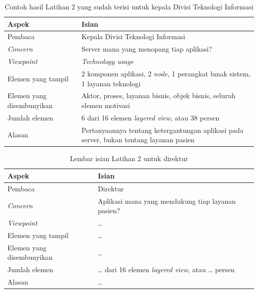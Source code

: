 \begin{table}[!htb]
  \centering
  \caption{Contoh hasil Latihan 2 yang sudah terisi untuk kepala Divisi
           Teknologi Informasi}
  \label{tab:ch04-lat2-contoh}
  \small
  \begin{tabularx}{\textwidth}{>{\raggedright\arraybackslash}p{3.2cm}X}
    \hline
    \textbf{Aspek} & \textbf{Isian} \\
    \hline
    Pembaca & Kepala Divisi Teknologi Informasi \\
    \hline
    \textit{Concern} & Server mana yang menopang tiap aplikasi? \\
    \hline
    \textit{Viewpoint} & \textit{Technology usage} \\
    \hline
    Elemen yang tampil & 2 komponen aplikasi, 2 \textit{node}, 1 perangkat lunak sistem, 1 layanan teknologi \\
    \hline
    Elemen yang disembunyikan & Aktor, proses, layanan bisnis, objek bisnis, seluruh elemen motivasi \\
    \hline
    Jumlah elemen & 6 dari 16 elemen \textit{layered view}, atau 38 persen \\
    \hline
    Alasan & Pertanyaannya tentang ketergantungan aplikasi pada server, bukan tentang layanan pasien \\
    \hline
  \end{tabularx}
\end{table}

\begin{table}[!htb]
  \centering
  \caption{Lembar isian Latihan 2 untuk direktur}
  \label{tab:ch04-lat2-hasil}
  \small
  \begin{tabularx}{\textwidth}{>{\raggedright\arraybackslash}p{3.2cm}X}
    \hline
    \textbf{Aspek} & \textbf{Isian} \\
    \hline
    Pembaca & Direktur \\
    \hline
    \textit{Concern} & Aplikasi mana yang mendukung tiap layanan pasien? \\
    \hline
    \textit{Viewpoint} & \dots \\
    \hline
    Elemen yang tampil & \dots \\
    \hline
    Elemen yang disembunyikan & \dots \\
    \hline
    Jumlah elemen & \dots{} dari 16 elemen \textit{layered view}, atau \dots{} persen \\
    \hline
    Alasan & \dots \\
    \hline
  \end{tabularx}
\end{table}

